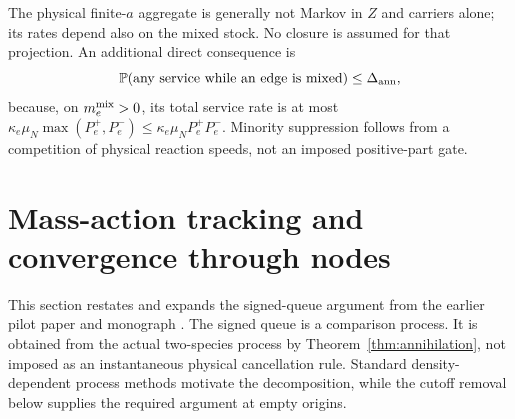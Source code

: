 \documentclass[11pt]{article}
\theoremstyle{definition}\newtheorem{definition}[theorem]{Definition}
\theoremstyle{remark}\newtheorem{remark}[theorem]{Remark}
\begin{document}
The physical finite-$a$ aggregate is generally not Markov in $Z$ and carriers alone; its rates depend also on the mixed stock. No closure is assumed for that projection. An additional direct consequence is
\[
 \mathbb P(\text{any service while an edge is mixed})\le\Delta_{\rm ann},
\]
because, on $m_e^{\rm mix}>0$, its total service rate is at most $\kappa_e\mu_N\max(P_e^+,P_e^-)\le\kappa_e\mu_NP_e^+P_e^-$. Minority suppression follows from a competition of physical reaction speeds, not an imposed positive-part gate.

\section{Mass-action tracking and convergence through nodes}\label{app:kinetic}
This section restates and expands the signed-queue argument from the earlier pilot paper and monograph \cite{PilotPrior,Monograph}. The signed queue is a comparison process. It is obtained from the actual two-species process by Theorem~\ref{thm:annihilation}, not imposed as an instantaneous physical cancellation rule. Standard density-dependent process methods motivate the decomposition, while the cutoff removal below supplies the required argument at empty origins.
\end{document}
